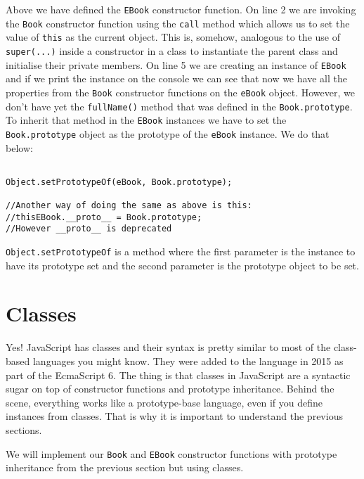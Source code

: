 \documentclass[a4paper, oneside, titlepage, 12pt]{book}
\begin{document}
Above we have defined the \texttt{EBook} constructor function. On line 2 we are invoking the \texttt{Book} constructor function using the \texttt{call} method which allows us to set the value of \texttt{this} as the current object. This is, somehow, analogous to the use of \texttt{super(...)} inside a constructor in a class to instantiate the parent class and initialise their private members. On line 5 we are creating an instance of \texttt{EBook} and if we print the instance on the console we can see that now we have all the properties from the \texttt{Book} constructor functions on the \texttt{eBook} object. However, we don't have yet the \texttt{fullName()} method that was defined in the \texttt{Book.prototype}. To inherit that method in the \texttt{EBook} instances we have to set the \texttt{Book.prototype} object as the prototype of the \texttt{eBook} instance. We do that below:

\begin{verbatim}

Object.setPrototypeOf(eBook, Book.prototype);

//Another way of doing the same as above is this:
//thisEBook.__proto__ = Book.prototype;
//However __proto__ is deprecated
\end{verbatim}

\texttt{Object.setPrototypeOf} is a method where the first parameter is the instance to have its prototype set and the second parameter is the prototype object to be set.

\section{Classes}

Yes! JavaScript has classes and their syntax is pretty similar to most of the class-based languages you might know. They were added to the language in 2015 as part of the EcmaScript 6. The thing is that classes in JavaScript are a syntactic sugar on top of constructor functions and prototype inheritance. Behind the scene, everything works like a prototype-base language, even if you define instances from classes. That is why it is important to understand the previous sections.

We will implement our \texttt{Book} and \texttt{EBook} constructor functions with prototype inheritance from the previous section but using classes.
\end{document}
